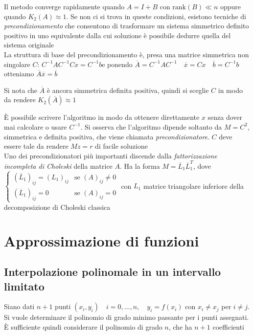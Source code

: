 \documentclass[openany]{book}
\begin{document}
Il metodo converge rapidamente quando $A=I+B$ con $\text{rank}(B)\ll n$ oppure quando $K_2(A)\approx 1$. 
Se non ci si trova in queste condizioni, esistono tecniche di \textit{precondizionamento} che consentono di 
trasformare un sistema simmetrico definito positivo in uno equivalente dalla cui soluzione è possibile 
dedurre quella del sistema originale 
\\

La struttura di base del precondizionamento è, presa una matrice simmetrica non singolare 
$C$: $C^{-1}AC^{-1}Cx=C^{-1}b$\quad e ponendo $\overline{A}=C^{-1}AC^{-1} \quad \overline{x}=Cx 
\quad \overline{b}=C^{-1}b$\quad otteniamo $\overline{A}\overline{x}=\overline{b}$

Si nota che $\overline{A}$ è ancora simmetrica definita positiva, quindi si sceglie $C$ in modo da rendere 
$K_2(\overline{A})\approx 1$

È possibile scrivere l'algoritmo in modo da ottenere direttamente $x$ senza dover mai calcolare o usare 
$C^{-1}$. Si osserva che l'algoritmo dipende soltanto da $M=C^2$, simmetrica e definita positiva, che viene 
chiamata \textit{precondizionatore}. $C$ deve essere tale da rendere $Mz=r$ di facile soluzione 
\\

Uno dei precondizionatori più importanti discende dalla \textit{fattorizzazione incompleta di Choleski} della 
matrice $A$. Ha la forma $M=\overline{L}_1\overline{L}_1^T$, dove
$\left\{ \begin{array}{ll}(\overline{L}_1)_{ij}=(L_1)_{ij} & \text{se } (A)_{ij}\neq 0 
\\ (\overline{L}_1)_{ij}=0 & \text{se } (A)_{ij}=0\end{array} \right.$ con $L_1$ matrice triangolare 
inferiore della decomposizione di Choleski classica

\chapter{Approssimazione di funzioni}

\section{Interpolazione polinomale in un intervallo limitato}

Siano dati $n+1$ punti $(x_i,y_i)\quad i=0,...,n,\quad y_i=f(x_i)$ con $x_i\neq x_j$ per $i\neq j$. Si vuole 
determinare il polinomio di grado minimo passante per i punti assegnati. È sufficiente quindi considerare il 
polinomio di grado $n$, che ha $n+1$ coefficienti
\end{document}
